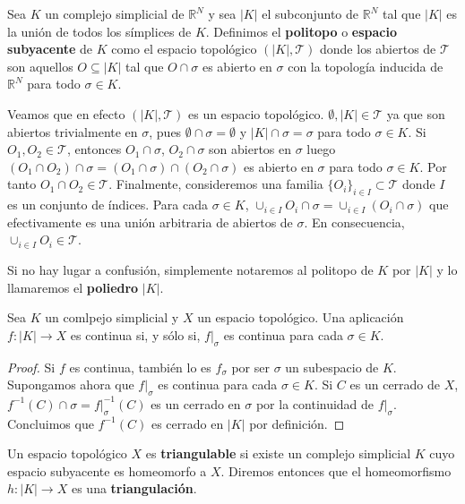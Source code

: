 \begin{definicion}
	Sea $K$ un complejo simplicial de $\mathbb{R}^N$ y sea $|K|$ el subconjunto de $\mathbb{R}^N$ tal que $|K|$ es la unión de todos los símplices de $K$. Definimos el \textbf{politopo} o \textbf{espacio subyacente} 
	de $K$ como el espacio topológico $(|K|, \mathcal{T})$ donde los abiertos de $\mathcal{T}$ son aquellos $O \subseteq |K|$ tal que $O \cap \sigma$ es abierto en $\sigma$ con la topología inducida de $\mathbb{R}^N$ para todo $\sigma \in K$.
\end{definicion}

Veamos que en efecto $(|K|, \mathcal{T})$ es un espacio topológico. $\emptyset, |K| \in \mathcal{T}$ ya que son abiertos trivialmente en $\sigma$, pues $\emptyset \cap \sigma = \emptyset$ y $|K| \cap \sigma = \sigma$ para todo $\sigma \in K$. Si $O_1, O_2 \in \mathcal{T}$, entonces $O_1 \cap \sigma$, $O_2 \cap \sigma$ son abiertos en $\sigma$ luego $(O_1 \cap O_2) \cap \sigma = (O_1 \cap \sigma) \cap (O_2 \cap \sigma)$ es abierto en $\sigma$ para todo $\sigma \in K$. Por tanto $O_1 \cap O_2 \in \mathcal{T}$. Finalmente, consideremos una familia $\{O_i\}_{i \in I} \subset \mathcal{T}$ donde $I$ es un conjunto de índices. Para cada $\sigma \in K$, $\cup_{i \in I} O_i \cap \sigma = \cup_{i \in I} (O_i \cap \sigma)$ que efectivamente es una unión arbitraria de abiertos de $\sigma$. En consecuencia, $\cup_{i \in I} O_i \in \mathcal{T}$.

Si no hay lugar a confusión, simplemente notaremos al politopo de $K$ por $|K|$ y lo llamaremos el \textbf{poliedro} $|K|$.

\begin{lema}\label{lem:cont_poly}
	Sea $K$ un comlpejo simplicial y $X$ un espacio topológico. Una aplicación $f: |K| \rightarrow X$ es continua si, y sólo si, $f|_{\sigma}$ es continua para cada $\sigma \in K$.
\end{lema}
\begin{proof}
	Si $f$ es continua, también lo es $f_{\sigma}$ por ser $\sigma$ un subespacio de $K$. Supongamos ahora que $f|_{\sigma}$ es continua para cada $\sigma \in K$. Si $C$ es un cerrado de $X$, $f^{-1}(C) \cap \sigma = f|_{\sigma}^{-1}(C)$ es un cerrado en $\sigma$ por la continuidad de $f|_{\sigma}$. Concluimos que $f^{-1}(C)$ es cerrado en $|K|$ por definición.
\end{proof}

\begin{definicion}
	Un espacio topológico $X$ es \textbf{triangulable} si existe un complejo simplicial $K$ cuyo espacio subyacente es homeomorfo a $X$. Diremos entonces que el homeomorfismo $h: |K| \rightarrow X$ es una \textbf{triangulación}.
\end{definicion}

